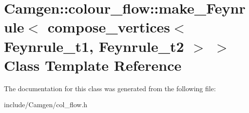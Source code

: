 \hypertarget{a00346}{}\section{Camgen\+:\+:colour\+\_\+flow\+:\+:make\+\_\+\+Feynrule$<$ compose\+\_\+vertices$<$ Feynrule\+\_\+t1, Feynrule\+\_\+t2 $>$ $>$ Class Template Reference}
\label{a00346}


The documentation for this class was generated from the following file\+:\begin{DoxyCompactItemize}
\item 
include/\+Camgen/col\+\_\+flow.\+h\end{DoxyCompactItemize}

